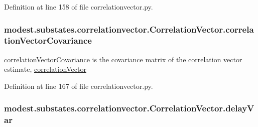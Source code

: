 Definition at line 158 of file correlationvector.\+py.

\subsubsection[{\texorpdfstring{correlation\+Vector\+Covariance}{correlationVectorCovariance}}]{\setlength{\rightskip}{0pt plus 5cm}modest.\+substates.\+correlationvector.\+Correlation\+Vector.\+correlation\+Vector\+Covariance}\hypertarget{classmodest_1_1substates_1_1correlationvector_1_1CorrelationVector_a03bf36ec74d2fa70eeec14da348bec0c}{}\label{classmodest_1_1substates_1_1correlationvector_1_1CorrelationVector_a03bf36ec74d2fa70eeec14da348bec0c}


\hyperlink{classmodest_1_1substates_1_1correlationvector_1_1CorrelationVector_a03bf36ec74d2fa70eeec14da348bec0c}{correlation\+Vector\+Covariance} is the covariance matrix of the correlation vector estimate, \hyperlink{classmodest_1_1substates_1_1correlationvector_1_1CorrelationVector_a81da583ee9077067b6aaa354fd8a8c49}{correlation\+Vector} 



Definition at line 167 of file correlationvector.\+py.

\subsubsection[{\texorpdfstring{delay\+Var}{delayVar}}]{\setlength{\rightskip}{0pt plus 5cm}modest.\+substates.\+correlationvector.\+Correlation\+Vector.\+delay\+Var}\hypertarget{classmodest_1_1substates_1_1correlationvector_1_1CorrelationVector_ab0c6ffbea793ae20593e85d033341595}{}\label{classmodest_1_1substates_1_1correlationvector_1_1CorrelationVector_ab0c6ffbea793ae20593e85d033341595}


